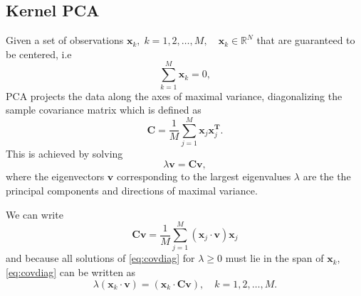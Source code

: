 \documentclass[7 pt]{article}
\begin{document}
\begin{multicols}{2}
\subsection{Kernel PCA}
Given a set of observations $\mathbf{x}_k, \; k=1,2,\dots,M, \quad \mathbf{x}_{k} \in \mathbb{R}^{N} $ that are guaranteed to be centered, i.e 
\begin{equation}
\sum_{k=1}^{M} \mathbf{x}_{k}=0,
\end{equation}
PCA projects the data along the axes of maximal variance, diagonalizing the sample covariance matrix which is defined as 
\begin{equation}
\mathbf{C}=\frac{1}{M}\sum_{j=1}^{M}\mathbf{x}_{j}\mathbf{x}_{j}^{\mathbf{T}}.
\end{equation}
This is achieved by solving 
\begin{equation}
\lambda \mathbf{v} = \mathbf{Cv}, \label{eq:covdiag}
\end{equation}
where the eigenvectors $\mathbf{v}$ corresponding to the largest eigenvalues $\lambda$ are the the principal components and directions of maximal variance.

We can write 
\begin{equation}
\mathbf{Cv}=\frac{1}{M}\sum_{j=1}^{M}(\mathbf{x}_{j} \cdot \mathbf{v}) \mathbf{x}_{j}
\end{equation}
and because all solutions of \eqref{eq:covdiag} for $\lambda \geq 0$ must lie in the span of $\mathbf{x}_{k}$, \eqref{eq:covdiag} can be written as 
\begin{equation}
\lambda(\mathbf{x}_{k} \cdot \mathbf{v})= (\mathbf{x}_{k} \cdot \mathbf{Cv}), \quad  k=1,2,\dots,M. \label{eq:modfifdiag}
\end{equation}


\end{multicols}
\end{document}
